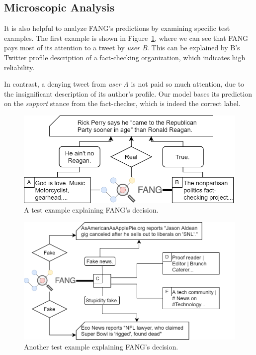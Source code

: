 \documentclass[sigconf]{acmart}
\theoremstyle{definition}
\theoremstyle{hypothesis}
\begin{document}
\subsection{Microscopic Analysis}
It is also helpful to analyze FANG's predictions by examining specific test examples.  The first example is shown in Figure~\ref{fig:micro_1},
where we can see that FANG pays most of its attention to a tweet by \textit{user B}. This can be explained by B's Twitter profile description of a fact-checking organization, which indicates high reliability. 

In contrast, a denying tweet from \textit{user A} is not paid so much attention, due to the insignificant description of its author's profile. Our model bases its prediction on the \emph{support} stance from the fact-checker, which is indeed the correct label.

\begin{figure}[t]
\centering
\includegraphics[scale=0.25]{micro1.png}
\caption{A test example explaining FANG's decision.}
\label{fig:micro_1}
\end{figure}

\begin{figure}[t]
\centering
\includegraphics[scale=0.25]{micro2.png}
\caption{Another test example explaining FANG's decision.}
\label{fig:micro_2}
\end{figure}
\end{document}
